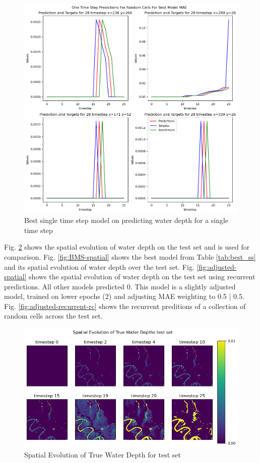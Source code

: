 \begin{figure}[tbph]
	\centering
	\includegraphics[width=0.8\linewidth, height=0.3\textheight]{Figures/Results/Final_Results/Best_Model_SS_SS_random_cell}
	\caption[Best single time step model on predicting water depth for a single time step]{Best single time step model on predicting water depth for a single time step}
	\label{fig:BSMS}
\end{figure}

Fig. \ref{fig:SpatialTrue} shows the spatial evolution of water depth on the test set and is used for comparison. Fig. \ref{fig:BMS-spatial} shows the best model from Table \ref{tab:best_ss} and its spatial evolution of water depth over the test set. Fig. \ref{fig:adjusted-spatial} shows the spatial evolution of water depth on the test set using recurrent predictions. All other models predicted 0. This model is a slightly adjusted model, trained on lower epochs (2) and adjusting MAE weighting to 0.5 | 0.5. Fig. \ref{fig:adjusted-recurrent-rc} shows the recurrent preditions of a collection of random cells across the test set.

\begin{figure}[tbph]
	\centering
	\includegraphics[width=0.8\linewidth, height=0.3\textheight]{Figures/Results/Final_Results/Best_Model_True_test_set}
	\caption[Spatial Evolution of True Water Depth for test set]{Spatial Evolution of True Water Depth for test set}
	\label{fig:SpatialTrue}
\end{figure}


